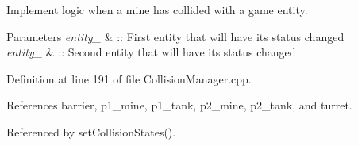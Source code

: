 Implement logic when a mine has collided with a game entity. 


\begin{DoxyParams}{Parameters}
{\em entity\-\_} & \-:\-: First entity that will have its status changed \\
\hline
{\em entity\-\_} & \-:\-: Second entity that will have its status changed \\
\hline
\end{DoxyParams}


Definition at line 191 of file Collision\-Manager.\-cpp.



References barrier, p1\-\_\-mine, p1\-\_\-tank, p2\-\_\-mine, p2\-\_\-tank, and turret.



Referenced by set\-Collision\-States().


